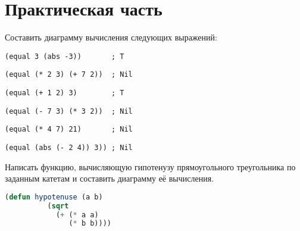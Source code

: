 \documentclass[a4paper,oneside,12pt]{extreport}
\begin{document}


\section*{Практическая часть}

\begin{task}
	Составить диаграмму вычисления следующих выражений:
	\begin{AutoMultiColEnumerate}
		\item \begin{lstlisting}[style=lispinline, gobble=24]
			(equal 3 (abs -3))       ; T
		\end{lstlisting}

		\item \begin{lstlisting}[style=lispinline, gobble=24]
			(equal (* 2 3) (+ 7 2))  ; Nil
		\end{lstlisting}

		\item \begin{lstlisting}[style=lispinline, gobble=24]
			(equal (+ 1 2) 3)        ; T
		\end{lstlisting}

		\item \begin{lstlisting}[style=lispinline, gobble=24]
			(equal (- 7 3) (* 3 2))  ; Nil
		\end{lstlisting}

		\item \begin{lstlisting}[style=lispinline, gobble=24]
			(equal (* 4 7) 21)       ; Nil
		\end{lstlisting}

		\item \begin{lstlisting}[style=lispinline, gobble=24]
			(equal (abs (- 2 4)) 3)) ; Nil
		\end{lstlisting}
	\end{AutoMultiColEnumerate}
\end{task}

\begin{task}
	Написать функцию, вычисляющую гипотенузу прямоугольного треугольника по заданным катетам и составить диаграмму её вычисления.

	\begin{lstlisting}[language=Lisp, gobble=16]
		(defun hypotenuse (a b)
		  (sqrt
		    (+ (* a a)
		       (* b b))))
	\end{lstlisting}
\end{task}
\end{document}
